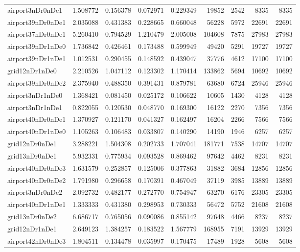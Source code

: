 \documentclass[../../../thesis.tex]{subfiles}
\begin{document}
\begin{longtable}{|l|r|r|r|r|r|r|r|r|}
airport3nDr0nDe1 & 1.508772 & 0.156378 & 0.072971 & 0.229349 & 19852 & 2542 & 8335 & 8335 \\
airport39nDr0nDe1 & 2.035088 & 0.431383 & 0.228665 & 0.660048 & 56228 & 5972 & 22691 & 22691 \\
airport37nDr0nDe1 & 5.260410 & 0.794529 & 1.210479 & 2.005008 & 104608 & 7875 & 27983 & 27983 \\
airport39nDr1nDe0 & 1.736842 & 0.426461 & 0.173488 & 0.599949 & 49420 & 5291 & 19727 & 19727 \\
airport39nDr1nDe1 & 1.012531 & 0.290455 & 0.148592 & 0.439047 & 37776 & 4612 & 17100 & 17100 \\
grid12nDr1nDe0 & 2.210526 & 1.047112 & 0.123302 & 1.170414 & 133862 & 5694 & 10692 & 10692 \\
airport39nDr0nDe2 & 2.375940 & 0.488350 & 0.391431 & 0.879781 & 63680 & 6724 & 25946 & 25946 \\
airport3nDr1nDe0 & 1.368421 & 0.081450 & 0.025172 & 0.106622 & 10605 & 1430 & 4128 & 4128 \\
airport3nDr1nDe1 & 0.822055 & 0.120530 & 0.048770 & 0.169300 & 16122 & 2270 & 7356 & 7356 \\
airport40nDr0nDe1 & 1.370927 & 0.121170 & 0.041327 & 0.162497 & 16204 & 2266 & 7566 & 7566 \\
airport40nDr1nDe0 & 1.105263 & 0.106483 & 0.033807 & 0.140290 & 14190 & 1946 & 6257 & 6257 \\
grid12nDr0nDe1 & 3.288221 & 1.504308 & 0.202733 & 1.707041 & 181771 & 7538 & 14707 & 14707 \\
grid13nDr0nDe1 & 5.932331 & 0.775934 & 0.093528 & 0.869462 & 97642 & 4462 & 8231 & 8231 \\
airport40nDr0nDe3 & 1.631579 & 0.252857 & 0.125006 & 0.377863 & 31882 & 3684 & 12856 & 12856 \\
airport40nDr0nDe2 & 1.791980 & 0.296658 & 0.170391 & 0.467049 & 37119 & 3985 & 13889 & 13889 \\
airport3nDr0nDe2 & 2.092732 & 0.482177 & 0.272770 & 0.754947 & 63270 & 6176 & 23305 & 23305 \\
airport40nDr1nDe1 & 1.333333 & 0.431380 & 0.298953 & 0.730333 & 56472 & 5752 & 21608 & 21608 \\
grid13nDr0nDe2 & 6.686717 & 0.765056 & 0.090086 & 0.855142 & 97648 & 4466 & 8237 & 8237 \\
grid12nDr1nDe1 & 2.649123 & 1.384257 & 0.183522 & 1.567779 & 168955 & 7191 & 13929 & 13929 \\
airport42nDr0nDe3 & 1.804511 & 0.134478 & 0.035997 & 0.170475 & 17489 & 1928 & 5608 & 5608 \\

\end{longtable}
\end{document}
